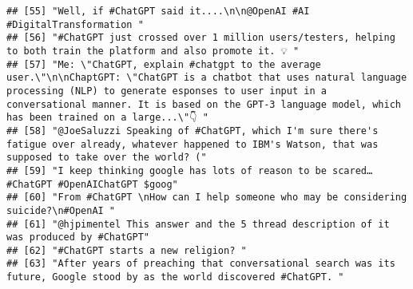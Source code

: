 \documentclass[
]{article}
\begin{document}
\begin{verbatim}
## [55] "Well, if #ChatGPT said it....\n\n@OpenAI #AI #DigitalTransformation "                                                                                                                                                                                                                                          
## [56] "#ChatGPT just crossed over 1 million users/testers, helping to both train the platform and also promote it. 💡 "                                                                                                                                                                                               
## [57] "Me: \"ChatGPT, explain #chatgpt to the average user.\"\n\nChaptGPT: \"ChatGPT is a chatbot that uses natural language processing (NLP) to generate esponses to user input in a conversational manner. It is based on the GPT-3 language model, which has been trained on a large...\"👇 "                      
## [58] "@JoeSaluzzi Speaking of #ChatGPT, which I'm sure there's fatigue over already, whatever happened to IBM's Watson, that was supposed to take over the world? ("                                                                                                                                                 
## [59] "I keep thinking google has lots of reason to be scared… #ChatGPT #OpenAIChatGPT $goog"                                                                                                                                                                                                                         
## [60] "From #ChatGPT \nHow can I help someone who may be considering suicide?\n#OpenAI "                                                                                                                                                                                                                              
## [61] "@hjpimentel This answer and the 5 thread description of it was produced by #ChatGPT"                                                                                                                                                                                                                           
## [62] "#ChatGPT starts a new religion? "                                                                                                                                                                                                                                                                              
## [63] "After years of preaching that conversational search was its future, Google stood by as the world discovered #ChatGPT. "                                                                                                                                                                                        

\end{verbatim}
\end{document}
